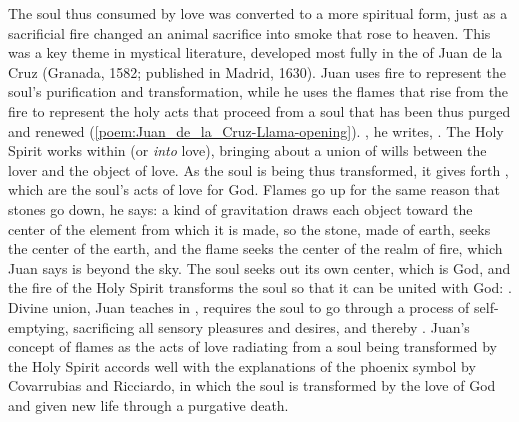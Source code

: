 The soul thus consumed by love was converted to a more spiritual form, just as
a sacrificial fire changed an animal sacrifice into smoke that rose to heaven.
This was a key theme in mystical literature, developed most fully in the
 of Juan de la Cruz (Granada, 1582; published in
Madrid, 1630).
Juan uses fire to represent the soul's purification and transformation, while
he uses the flames that rise from the fire to represent the holy acts that
proceed from a soul that has been thus purged and renewed
(\cref{poem:Juan_de_la_Cruz-Llama-opening}).
, he writes, .%
    \Autocite[790]{JuandelaCruz:Llama} 
The Holy Spirit works within  (or
\emph{into} love), bringing about a union of wills between the lover and the
object of love.
As the soul is being thus transformed, it gives forth , which
are the soul's acts of love for God.
Flames go up for the same reason that stones go down, he says: a kind of
gravitation draws each object toward the center of the element from which it is
made, so the stone, made of earth, seeks the center of the earth, and the flame
seeks the center of the realm of fire, which Juan says is beyond the sky.%
    \Autocite[792--795]{JuandelaCruz:Llama}
The soul seeks out its own center, which is God, and the fire of the Holy
Spirit transforms the soul so that it can be united with God: .%
    \Autocite[791]{JuandelaCruz:Llama} 
Divine union, Juan teaches in , requires the
soul to go through a process of self-emptying, sacrificing all sensory
pleasures and desires, and thereby .%
    \Autocite[191]{JuandelaCruz:Subida}
Juan's concept of flames as the acts of love radiating from a soul being
transformed by the Holy Spirit accords well with the explanations of the
phoenix symbol by Covarrubias and Ricciardo, in which the soul is transformed by
the love of God and given new life through a purgative death.

